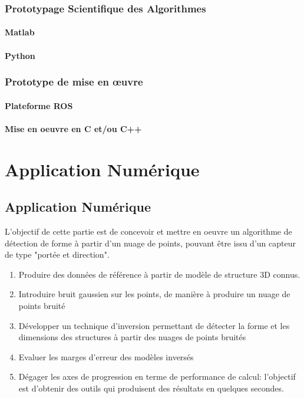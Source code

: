 \documentclass[12pt,a4paper]{report}
\begin{document}
\section{Prototypage Scientifique des Algorithmes}
\subsection{Matlab}
\subsection{Python}
\section{Prototype de mise en œuvre}
\subsection{Plateforme ROS}
\subsection{Mise en oeuvre en C et/ou C++}

\part{Application Numérique}

\chapter{Application Numérique}
L'objectif de cette partie est de concevoir et mettre en oeuvre un algorithme de détection de forme à partir d'un nuage de points, pouvant être issu d'un capteur de type "portée et direction".

\begin{enumerate}
\item
Produire des données de référence à partir de modèle de structure 3D connus.
\item
Introduire bruit gaussien sur les points, de manière à produire un nuage de points bruité
\item
Développer un technique d'inversion permettant de détecter la forme
et les dimensions des structures à partir des nuages de points
bruités
\item
Evaluer les marges d'erreur des modèles inversés
\item
Dégager les axes de progression en terme de performance de calcul:
l'objectif est d'obtenir des outils qui produisent des résultats en
quelques secondes.
\end{enumerate}
\end{document}
